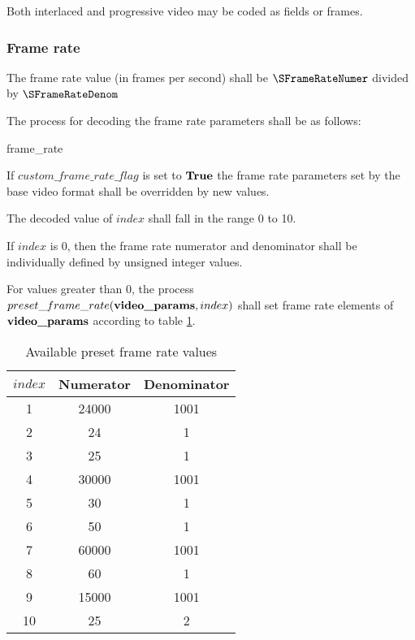 Both interlaced and progressive video may be coded as fields or frames.

\subsubsection{Frame rate}
\label{framerate}

The frame rate value (in frames per second) shall be 
$\SFrameRateNumer$ divided by $\SFrameRateDenom$

The process for decoding the frame rate parameters shall be as follows:

\begin{pseudo}{frame\_rate}{\VideoParams}
    \bsELSE
     \bsEND
\bsEND
\end{pseudo}

If $custom\_frame\_rate\_flag$ is set to $\text{\bf{True}}$ the frame rate parameters set
by the base video format shall be overridden by new values.

The decoded value of $index$ shall fall in the range 0 to 10.

If $index$ is 0, then the frame rate numerator and denominator shall be
individually defined by unsigned integer values.

For values greater than $0$, the process $preset\_frame\_rate(\textbf{video\_params},index)$ 
shall set frame rate elements of $\textbf{video\_params}$ according to table \ref{table:frameratevalues}.

\begin{table}[!ht]
\centering
\begin{tabular}{|c|c|c|}
\hline
\rowcolor[gray]{0.75}$index$ & Numerator & Denominator \\
\hline
1 & 24000 & 1001 \\
\hline
2 & 24 & 1 \\
\hline
3 & 25 & 1 \\
\hline
4 & 30000 & 1001 \\
\hline
5 & 30 & 1 \\
\hline
6 & 50 & 1 \\
\hline
7 & 60000 & 1001 \\
\hline
8 & 60 & 1 \\
\hline
9 & 15000 & 1001 \\
\hline
10 & 25 & 2 \\
\hline
\end{tabular}
\caption{Available preset frame rate values}\label{table:frameratevalues}
\end{table}

